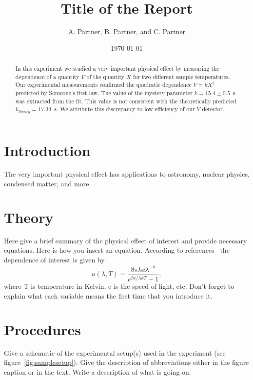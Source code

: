 \documentclass[letterpaper,12pt]{article}
\begin{document}
\title{Title of the Report}
\author{A. Partner, B. Partner, and C. Partner}
\date{\today}
\maketitle

\begin{abstract}
In this experiment we studied a very important physical effect by measuring the
dependence of a quantity $V$ of the quantity $X$ for two different sample
temperatures.  Our experimental measurements confirmed the quadratic dependence
$V = kX^2$ predicted by Someone's first law. The value of the mystery parameter
$k = 15.4\pm 0.5$~s was extracted from the fit. This value is
not consistent with the theoretically predicted $k_{theory}=17.34$~s. We attribute this
discrepancy to low efficiency of our $V$-detector.
\end{abstract}


\section{Introduction}

The very important physical effect has applications to astronomy, nuclear physics, condensed matter, and more. 


\section{Theory}

Here give a brief summary of the physical effect of interest and provide
necessary equations. Here is how you insert an equation. According to
references~\cite{melissinos, Cyr, Wiki} the dependence of interest is given
by
\begin{equation} \label{eq:aperp} %
u(\lambda,T)=\frac{8\pi hc\lambda^{-5}}{e^{hc/\lambda kT}-1},
\end{equation}
where T is temperature in Kelvin, c is the speed of light, etc. Don't forget to
explain what each variable means the first time that you introduce it.


\section{Procedures}

Give a schematic of the experimental setup(s) used in the experiment (see
figure~\ref{fig:samplesetup}). Give the description of  abbreviations
either in the figure caption or in the text. Write a description of what is
going on. 
\end{document}
